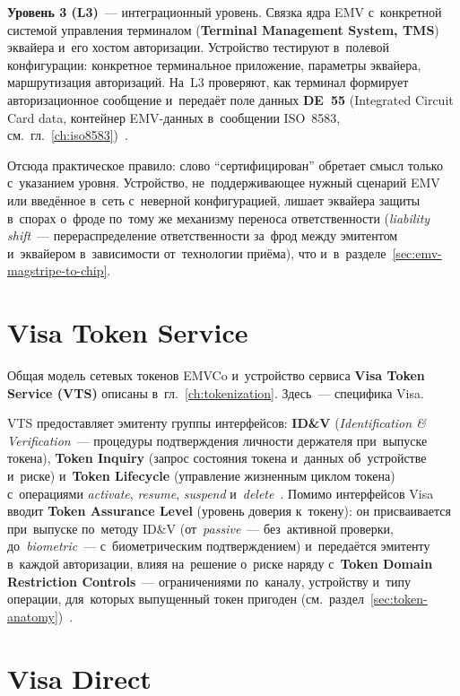 \textbf{Уровень 3 (L3)}~--- интеграционный уровень. Связка ядра EMV
с~конкретной системой управления терминалом (\textbf{Terminal Management
System, TMS}) эквайера и~его хостом авторизации. Устройство тестируют в~полевой
конфигурации: конкретное терминальное приложение, параметры эквайера,
маршрутизация авторизаций. На~L3 проверяют, как терминал формирует
авторизационное сообщение и~передаёт поле данных \textbf{DE~55} (Integrated
  Circuit Card data, контейнер EMV-данных в~сообщении ISO~8583,
см.~гл.~\ref{ch:iso8583})~\cite{visa-tadg}.

Отсюда практическое правило: слово \enquote{сертифицирован} обретает смысл
только с~указанием уровня. Устройство, не~поддерживающее нужный
сценарий EMV или введённое в~сеть с~неверной конфигурацией, лишает эквайера
защиты в~спорах о~фроде по~тому же механизму переноса ответственности
(\textit{liability shift}~--- перераспределение ответственности за~фрод между
эмитентом и~эквайером в~зависимости от~технологии приёма), что
и~в~разделе~\ref{sec:emv-magstripe-to-chip}.

\section{Visa Token Service}\label{sec:visa-vts}

Общая модель сетевых токенов EMVCo и~устройство сервиса \textbf{Visa Token
Service (VTS)} описаны в~гл.~\ref{ch:tokenization}. Здесь~--- специфика Visa.

VTS предоставляет эмитенту группы интерфейсов: \textbf{ID\&V}
(\textit{Identification \& Verification}~--- процедуры подтверждения личности
держателя при~выпуске токена), \textbf{Token
Inquiry} (запрос состояния токена и~данных об~устройстве и~риске)
и~\textbf{Token Lifecycle} (управление жизненным циклом токена) с~операциями
\textit{activate}, \textit{resume}, \textit{suspend} и~\textit{delete}~\cite{visa-vts}. Помимо интерфейсов Visa
вводит \textbf{Token Assurance Level} (уровень доверия к~токену): он
присваивается при~выпуске по~методу ID\&V (от~\textit{passive}~--- без~активной
проверки, до~\textit{biometric}~--- с~биометрическим подтверждением) и~передаётся
эмитенту в~каждой авторизации, влияя на~решение о~риске наряду с~\textbf{Token
Domain Restriction Controls}~--- ограничениями по~каналу, устройству и~типу
операции, для~которых выпущенный токен пригоден
(см.~раздел~\ref{sec:token-anatomy})~\cite{visa-vts,emvco-payment-tokenisation-guide}.

\section{Visa Direct}\label{sec:visa-direct}

